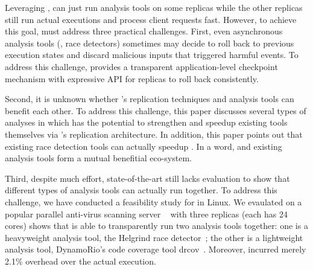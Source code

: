 


Leveraging \repbox, \xxx can just run analysis tools on some replicas while the other replicas 
still run actual executions and process client requests fast. However, to achieve this goal, 
\xxx must address three practical challenges. First, even asynchronous analysis tools (\eg, race detectors) 
sometimes may decide to roll back to previous execution states and discard 
malicious inputs that triggered harmful events. To address this challenge, 
\xxx provides a transparent application-level checkpoint mechanism 
with expressive API for replicas to roll back consistently.

Second, it is unknown whether \xxx's replication techniques and analysis tools can benefit 
each other. To address this challenge, this paper discusses several types of 
analyses in which \xxx has the potential to strengthen and speedup existing 
tools themselves via \xxx's replication architecture. In addition, 
this paper points out that existing race detection tools can actually speedup 
\xxx. In a word, \xxx and existing analysis tools form a mutual benefitial 
eco-system.

Third, despite much effort, state-of-the-art still lacks evaluation to show that different types of 
analysis tools can actually run together. To address this challenge, we have conducted 
a feasibility study for \xxx in Linux. We evaulated on a popular parallel anti-virus 
scanning server \clamav~\cite{clamav} with three 
replicas (each has 24 cores) shows that \xxx is able to transparently run two 
analysis tools together: one is a heavyweight analysis tool, the Helgrind race 
detector~\cite{valgrind:pldi}; the other is a lightweight analysis tool, 
DynamoRio's code coverage tool drcov~\cite{dynamorio}. Moreover, \xxx incurred 
merely 2.1\% overhead over the actual execution.


